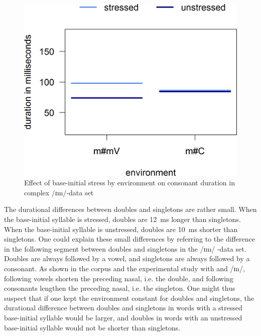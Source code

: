  \begin{figure}
 	
 	\includegraphics [scale=0.5] {images/Experiment/imModelInterEnvStress}
 	\caption{Effect of base-initial stress by environment on consonant duration in complex /ɪm/-data set}
 	\label{fig:NumNasal imComplex experiment}
 	
 \end{figure}



The durational differences between doubles and singletons are rather small.  When the base-initial syllable is stressed, doubles are 12~ms longer than singletons. When the base-initial syllable is unstressed, doubles are 10~ms shorter than singletons. 
  One could explain these small differences by referring to the difference in the following segment between doubles and singletons in the /ɪm/ -data set. Doubles are always followed by a vowel, and singletons are always followed by a consonant. As shown in the corpus and the experimental study with  and /ɪn/, following vowels shorten the preceding nasal, i.e. the double, and following consonants lengthen the preceding nasal, i.e. the singleton. One might thus suspect that if one kept the environment constant for doubles and singletons, the durational difference between doubles and singletons in words with a stressed base-initial syllable would be larger, and doubles in words with an unstressed base-initial syllable would not be shorter than singletons. 

